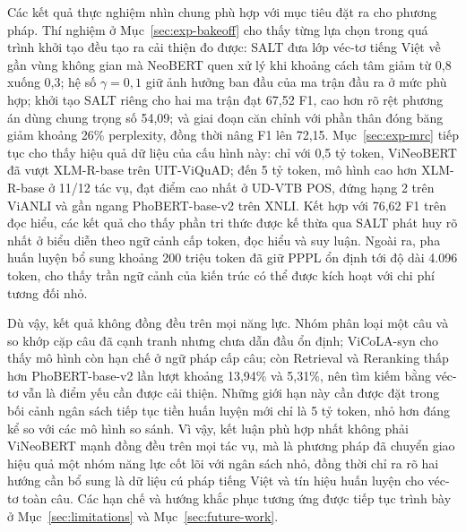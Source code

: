 Các kết quả thực nghiệm nhìn chung phù hợp với mục tiêu đặt ra cho phương pháp. Thí
nghiệm ở Mục~\ref{sec:exp-bakeoff} cho thấy từng lựa chọn trong quá trình khởi tạo đều
tạo ra cải thiện đo được: SALT đưa lớp véc-tơ tiếng Việt về gần vùng không gian mà
NeoBERT quen xử lý khi khoảng cách tâm giảm từ 0,8 xuống 0,3; hệ số
$\gamma = 0{,}1$ giữ ảnh hưởng ban đầu của ma trận đầu ra ở mức phù hợp; khởi tạo SALT
riêng cho hai ma trận đạt 67,52 F1, cao hơn rõ rệt phương án dùng chung trọng số 54,09;
và giai đoạn căn chỉnh với phần thân đóng băng giảm khoảng 26\% perplexity, đồng thời
nâng F1 lên 72,15. Mục~\ref{sec:exp-mrc} tiếp tục cho thấy hiệu quả dữ liệu của cấu hình
này: chỉ với 0,5 tỷ token, ViNeoBERT đã vượt XLM-R-base trên UIT-ViQuAD; đến 5 tỷ token,
mô hình cao hơn XLM-R-base ở 11/12 tác vụ, đạt điểm cao nhất ở UD-VTB POS, đứng hạng 2
trên ViANLI và gần ngang PhoBERT-base-v2 trên XNLI. Kết hợp với 76,62 F1 trên đọc hiểu,
các kết quả cho thấy phần tri thức được kế thừa qua SALT phát huy rõ nhất ở biểu diễn
theo ngữ cảnh cấp token, đọc hiểu và suy luận. Ngoài ra, pha huấn luyện bổ sung khoảng
200 triệu token đã giữ PPPL ổn định tới độ dài 4.096 token, cho thấy trần ngữ cảnh của
kiến trúc có thể được kích hoạt với chi phí tương đối nhỏ.

Dù vậy, kết quả không đồng đều trên mọi năng lực. Nhóm phân loại một câu và so khớp cặp
câu đã cạnh tranh nhưng chưa dẫn đầu ổn định; ViCoLA-syn cho thấy mô hình còn hạn chế ở
ngữ pháp cấp câu; còn Retrieval và Reranking thấp hơn PhoBERT-base-v2 lần lượt khoảng
13,94\% và 5,31\%, nên tìm kiếm bằng véc-tơ vẫn là điểm yếu cần được cải thiện. Những
giới hạn này cần được đặt trong bối cảnh ngân sách tiếp tục tiền huấn luyện mới chỉ là
5 tỷ token, nhỏ hơn đáng kể so với các mô hình so sánh. Vì vậy, kết luận phù hợp nhất
không phải ViNeoBERT mạnh đồng đều trên mọi tác vụ, mà là phương pháp đã chuyển giao hiệu
quả một nhóm năng lực cốt lõi với ngân sách nhỏ, đồng thời chỉ ra rõ hai hướng cần bổ
sung là dữ liệu cú pháp tiếng Việt và tín hiệu huấn luyện cho véc-tơ toàn câu. Các
hạn chế và hướng khắc phục tương ứng được tiếp tục trình bày ở
Mục~\ref{sec:limitations} và Mục~\ref{sec:future-work}.
